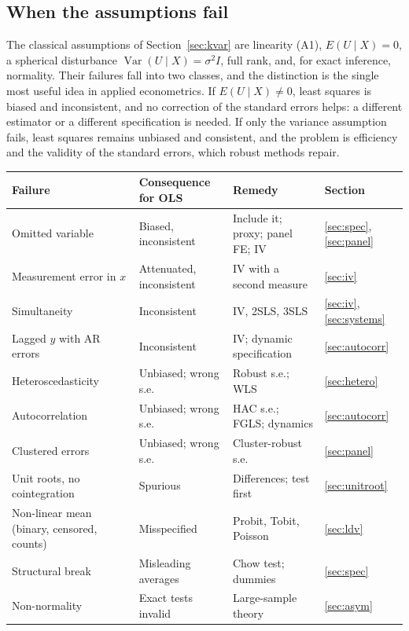 \documentclass[11pt,a4paper]{article}
\numberwithin{equation}{section}
\DeclareMathOperator{\Var}{Var}
\theoremstyle{definition}
\begin{document}
\subsection{When the assumptions fail}
\label{ssec:failures}

The classical assumptions of Section~\ref{sec:kvar} are linearity (A1), $E(U \mid X) = 0$, a spherical disturbance $\Var(U \mid X) = \sigma^2I$, full rank, and, for exact inference,
normality. Their failures fall into two classes, and the distinction is the single most useful idea in applied econometrics. If $E(U \mid X) \neq 0$, least
squares is biased and inconsistent, and no correction of the standard errors helps: a different estimator or a different specification is needed. If
only the variance assumption fails, least squares remains unbiased and consistent, and the problem is efficiency and the validity of the standard
errors, which robust methods repair.

\begin{center}
\renewcommand{\arraystretch}{1.25}
\small
\begin{tabular}{p{3.5cm}p{3.6cm}p{4.2cm}l}
\hline
Failure & Consequence for OLS & Remedy & Section\\
\hline
Omitted variable & Biased, inconsistent & Include it; proxy; panel FE; IV & \ref{sec:spec}, \ref{sec:panel}\\
Measurement error in $x$ & Attenuated, inconsistent & IV with a second measure & \ref{sec:iv}\\
Simultaneity & Inconsistent & IV, 2SLS, 3SLS & \ref{sec:iv}, \ref{sec:systems}\\
Lagged $y$ with AR errors & Inconsistent & IV; dynamic specification & \ref{sec:autocorr}\\
Heteroscedasticity & Unbiased; wrong s.e. & Robust s.e.; WLS & \ref{sec:hetero}\\
Autocorrelation & Unbiased; wrong s.e. & HAC s.e.; FGLS; dynamics & \ref{sec:autocorr}\\
Clustered errors & Unbiased; wrong s.e. & Cluster-robust s.e. & \ref{sec:panel}\\
Unit roots, no cointegration & Spurious & Differences; test first & \ref{sec:unitroot}\\
Non-linear mean (binary, censored, counts) & Misspecified & Probit, Tobit, Poisson & \ref{sec:ldv}\\
Structural break & Misleading averages & Chow test; dummies & \ref{sec:spec}\\
Non-normality & Exact tests invalid & Large-sample theory & \ref{sec:asym}\\
\hline
\end{tabular}
\end{center}
\end{document}
